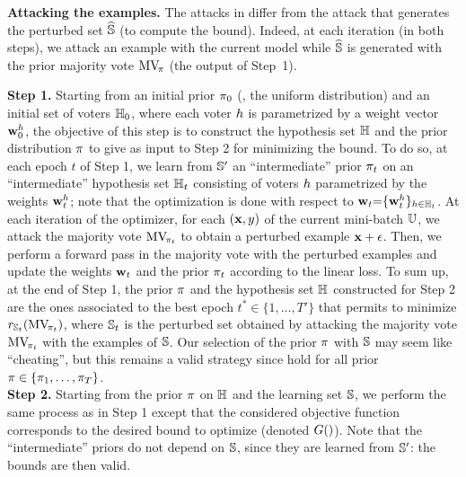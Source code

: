 {\bf Attacking the examples.} The attacks in  differ from the attack that generates the perturbed set $\Spert$ (to compute the bound). 
Indeed, at each iteration (in both steps), we attack an example with the current model while $\Spert$ is generated with the prior majority vote $\MVP$ (the output of Step~1).

\textbf{Step 1.} 
Starting from an initial prior $\P_0$ (\eg, the uniform distribution) and an initial set of voters $\H_0$, where each voter $\h$ is parametrized by a weight vector $\wbf^{\h}_0$, the objective of this step is to construct the hypothesis set $\H$ and the prior distribution $\P$ to give as input to Step 2 for minimizing the bound.
To do so, at each epoch $t$ of Step 1, we learn from $\S'$ an ``intermediate'' prior $\P_t$ on an ``intermediate'' hypothesis set $\H_t$ consisting of voters $\h$ parametrized by the weights $\wbf^{\h}_t$;
note that the optimization is done with respect to $\wbf_{t}{=}\{\wbf^{\h}_{t}\}_{\h\in\H_t}$.
At each iteration of the optimizer, for each $(\x,\y)$ of the current mini-batch $\batch$, we attack the majority vote $\MVPt$ to obtain a perturbed example $\x+\epsilon$.
Then, we perform a forward pass in the majority vote with the perturbed examples and update the weights $\wbf_t$ and the prior $\P_{t}$ according to the linear loss.
To sum up, at the end of Step 1, the prior $\P$ and the hypothesis set $\H$ constructed for Step 2 are the ones associated to the best epoch $t^*\in\{1,\ldots,T'\}$ that permits to minimize $\RiskS_{\S_t}(\MVPt)$, where  $\S_t$ is the perturbed set obtained by attacking the majority vote $\MVPt$ with the examples of $\S$.
Our selection of the prior $\P$ with $\S$ may seem like ``cheating'', but this remains a valid strategy since  hold for all prior $\P\in\{\P_1,\dots,\P_\iter\}$.\\

\textbf{Step 2.} Starting from the prior $\P$ on $\H$ and the learning set $\S$, we perform the same process as in Step 1 except that the considered objective function corresponds to the desired bound to optimize (denoted $\obj()$). 
Note that the ``intermediate'' priors do not depend on $\S$, since they are learned from $\S'$: the bounds are then valid.

